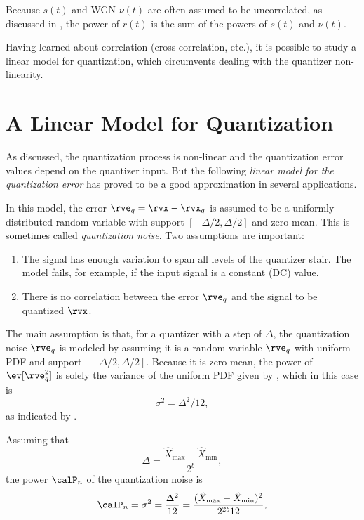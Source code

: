 Because $s(t)$ and WGN $\nu(t)$ are often assumed to be uncorrelated, as discussed in
, the power of $r(t)$ is the sum of the powers of $s(t)$ and $\nu(t)$.
\eExample


Having learned about correlation (cross-correlation, etc.), it is possible to study a linear model for quantization, which circumvents dealing with the quantizer non-linearity.

\section{{\akadvanced} A Linear Model for Quantization}

As discussed, the quantization process is non-linear and the quantization error values depend on the quantizer input. But the following \emph{linear model for the quantization error} has proved to be a good approximation in several applications.

In this model, the error $\rve_q = \rvx - \rvx_q$ is assumed to be a uniformly distributed random variable with support $[-\Delta/2, \Delta/2]$ and zero-mean. This is sometimes called \emph{quantization noise}.
Two assumptions are important:
\begin{enumerate}
	\item The signal has enough variation to span all levels of the quantizer stair. The model fails, for example, if the input signal is a constant (DC) value.
	\item There is no correlation between the error $\rve_q$ and the signal to be quantized $\rvx$. 
\end{enumerate}
The main assumption is that, for a quantizer with a step of $\Delta$, the quantization noise $\rve_q$ is modeled by assuming it is a random variable $\rve_q$ with uniform PDF and support $[-\Delta/2, \Delta/2].$ Because it is zero-mean, the power of $\ev[\rve_q^2]$ is solely the variance of the uniform PDF given by , which in this case is
\begin{equation}
\sigma^2 = \Delta^2 / 12,
\end{equation}
as indicated by .

Assuming that 
\[
\Delta = \frac{\hat X_{\textrm{max}} - \hat X_{\textrm{min}}}{2^b},
\]
the power $\calP_n$ of the quantization noise is
\begin{equation}
\calP_n = \sigma^2 = \frac{\Delta^2}{12} = \frac{ (\hat X_{\textrm{max}} - \hat X_{\textrm{min}})^2} {2^{2b} 12},
\label{eq:quantizationNoisePower}
\end{equation}



